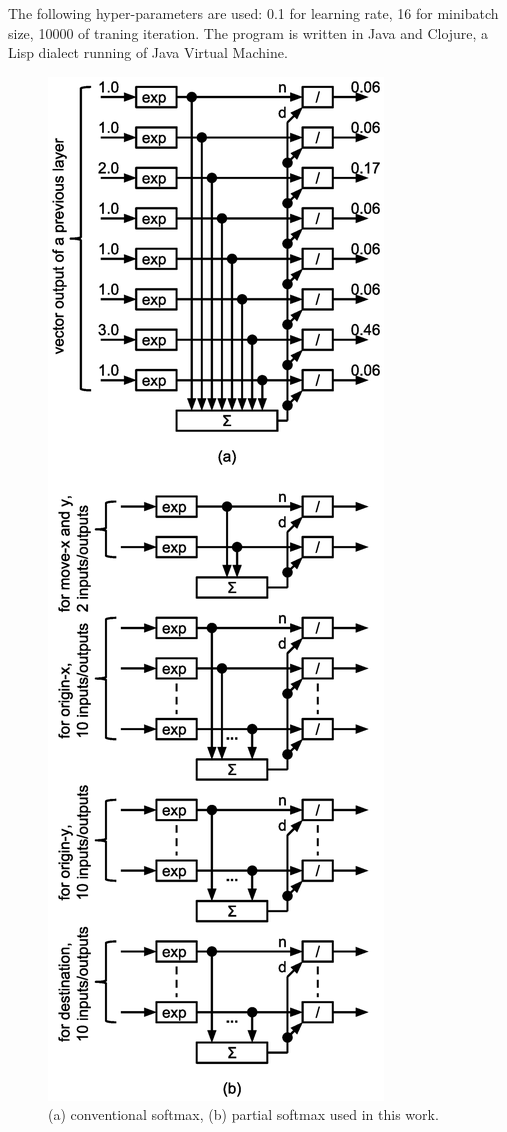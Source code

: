 \documentclass[twocolumn]{article}
\begin{document}
The following hyper-parameters are used:
0.1 for learning rate, 16 for minibatch size, 10000 of traning iteration.
The program is written in Java and Clojure,
a Lisp dialect running of Java Virtual Machine.

\begin{figure}[!tp]
 \begin{center}
  \begin{minipage}{\hsize}
   \includegraphics[width=0.7\hsize]{fig/partial_softmax_04.eps}
   \caption{(a) conventional softmax, (b) partial softmax used in this work.}
   \label{fig:partial_softmax}
  \end{minipage}
 \end{center}
\end{figure}
\end{document}
